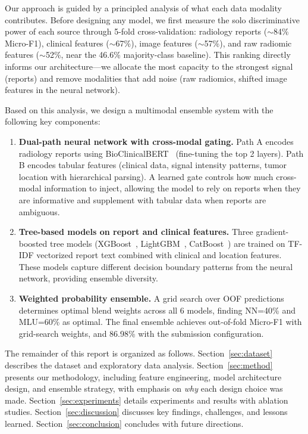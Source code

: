 Our approach is guided by a principled analysis of what each data modality contributes. Before designing any model, we first measure the solo discriminative power of each source through 5-fold cross-validation: radiology reports ($\sim$84\% Micro-F1), clinical features ($\sim$67\%), image features ($\sim$57\%), and raw radiomic features ($\sim$52\%, near the 46.6\% majority-class baseline). This ranking directly informs our architecture---we allocate the most capacity to the strongest signal (reports) and remove modalities that add noise (raw radiomics, shifted image features in the neural network).

Based on this analysis, we design a multimodal ensemble system with the following key components:

\begin{enumerate}
  \item \textbf{Dual-path neural network with cross-modal gating.} Path A encodes radiology reports using BioClinicalBERT~\cite{alsentzer2019} (fine-tuning the top 2 layers). Path B encodes tabular features (clinical data, signal intensity patterns, tumor location with hierarchical parsing). A learned gate controls how much cross-modal information to inject, allowing the model to rely on reports when they are informative and supplement with tabular data when reports are ambiguous.
  \item \textbf{Tree-based models on report and clinical features.} Three gradient-boosted tree models (XGBoost~\cite{chen2016}, LightGBM~\cite{ke2017}, CatBoost~\cite{prokhorenkova2018}) are trained on TF-IDF vectorized report text combined with clinical and location features. These models capture different decision boundary patterns from the neural network, providing ensemble diversity.
  \item \textbf{Weighted probability ensemble.} A grid search over OOF predictions determines optimal blend weights across all 6 models, finding NN=40\% and MLU=60\% as optimal. The final ensemble achieves  out-of-fold Micro-F1 with grid-search weights, and 86.98\% with the submission configuration.
\end{enumerate}

The remainder of this report is organized as follows. Section~\ref{sec:dataset} describes the dataset and exploratory data analysis. Section~\ref{sec:method} presents our methodology, including feature engineering, model architecture design, and ensemble strategy, with emphasis on \emph{why} each design choice was made. Section~\ref{sec:experiments} details experiments and results with ablation studies. Section~\ref{sec:discussion} discusses key findings, challenges, and lessons learned. Section~\ref{sec:conclusion} concludes with future directions.
